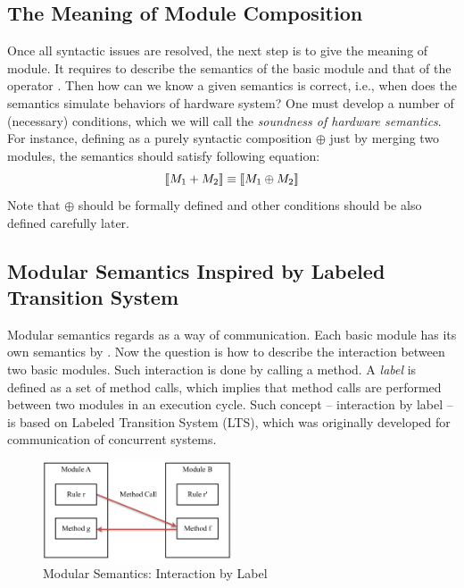 \subsection{The Meaning of Module Composition}
Once all syntactic issues are resolved, the next step is to give the
meaning of module. It requires to describe the semantics of the basic
module  and that of the \ModP{}
operator \Sem{\ModP{}}. Then how can we know a given semantics is
correct, i.e., when does the semantics simulate behaviors of hardware
system?  One must develop a number of (necessary) conditions, which we
will call the \emph{soundness of hardware semantics}. For instance,
defining \ModP{} as a purely syntactic composition $\oplus$ just by
merging two modules, the semantics should satisfy following equation:
$$\llbracket M_1 +{} M_2 \rrbracket \equiv \llbracket M_1 \oplus M_2 \rrbracket$$ Note that
$\oplus$ should be formally defined and other conditions should be
also defined carefully later.

\subsection{Modular Semantics Inspired by Labeled Transition System}
\label{sec:mod}

Modular semantics regards \Sem{\ModP{}} as a way of
communication. Each basic module has its own semantics by
. Now the question is how to describe
the interaction between two basic modules. Such interaction is done by
calling a method. A \emph{label} is defined as a set of method calls,
which implies that method calls are performed between two modules in
an execution cycle. Such concept -- interaction by label -- is based
on Labeled Transition System (LTS), which was originally developed for
communication of concurrent systems.
\begin{figure}[h]
  \centering
  \includegraphics[width=0.5\textwidth]{figures/modular-sem.pdf}
  \caption{Modular Semantics: Interaction by Label}
  \label{fig:mod}
\end{figure}


